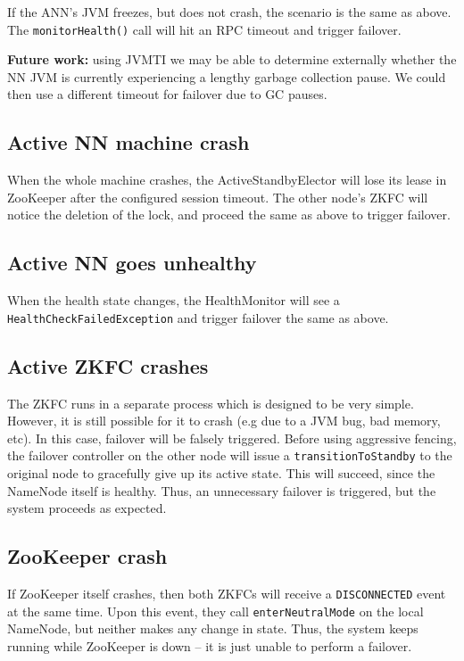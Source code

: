 \documentclass{article}
\begin{document}
If the ANN's JVM freezes, but does not crash, the scenario is the same as above. The {\tt monitorHealth()} call will hit an RPC timeout and trigger failover.

{\bf Future work:} using JVMTI we may be able to determine externally whether the NN JVM is currently experiencing a lengthy garbage collection pause. We could then use a different timeout for failover due to GC pauses.

\subsection{Active NN machine crash}

When the whole machine crashes, the ActiveStandbyElector will lose its lease in ZooKeeper after the configured session timeout. The other node's ZKFC will notice the deletion of the lock, and proceed the same as above to trigger failover.

\subsection{Active NN goes unhealthy}

When the health state changes, the HealthMonitor will see a {\tt HealthCheckFailedException} and trigger failover the same as above.

\subsection{Active ZKFC crashes}

The ZKFC runs in a separate process which is designed to be very simple. However, it is still possible for it to crash (e.g due to a JVM bug, bad memory, etc). In this case, failover will be falsely triggered. Before using aggressive fencing, the failover controller on the other node will issue a {\tt transitionToStandby} to the original node to gracefully give up its active state. This will succeed, since the NameNode itself is healthy. Thus, an unnecessary failover is triggered, but the system proceeds as expected.

\subsection{ZooKeeper crash}

If ZooKeeper itself crashes, then both ZKFCs will receive a {\tt DISCONNECTED} event at the same time. Upon this event, they call {\tt enterNeutralMode} on the local NameNode, but neither makes any change in state. Thus, the system keeps running while ZooKeeper is down -- it is just unable to perform a failover.
\end{document}
